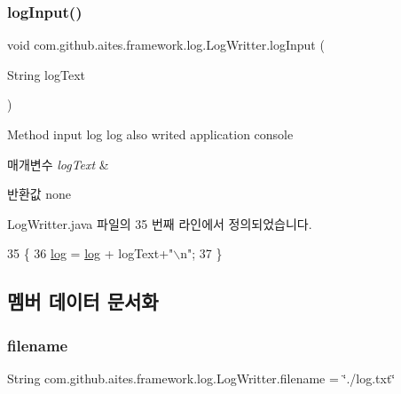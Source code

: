 \subsubsection{\texorpdfstring{log\+Input()}{logInput()}}
{\footnotesize\ttfamily void com.\+github.\+aites.\+framework.\+log.\+Log\+Writter.\+log\+Input (\begin{DoxyParamCaption}\item[{String}]{log\+Text }\end{DoxyParamCaption})}



Method input log log also writed application console 


\begin{DoxyParams}{매개변수}
{\em log\+Text} & \\
\hline
\end{DoxyParams}
\begin{DoxyReturn}{반환값}
none 
\end{DoxyReturn}


Log\+Writter.\+java 파일의 35 번째 라인에서 정의되었습니다.


\begin{DoxyCode}
35                                         \{
36         \mbox{\hyperlink{classcom_1_1github_1_1aites_1_1framework_1_1log_1_1_log_writter_a4166c55fe968efbdc9c0c00a14f76806}{log}} = \mbox{\hyperlink{classcom_1_1github_1_1aites_1_1framework_1_1log_1_1_log_writter_a4166c55fe968efbdc9c0c00a14f76806}{log}} + logText+\textcolor{stringliteral}{"\(\backslash\)n"};
37     \}
\end{DoxyCode}


\subsection{멤버 데이터 문서화}
\mbox{\label{classcom_1_1github_1_1aites_1_1framework_1_1log_1_1_log_writter_ad2861afbf5d3a065972fcb30ac4c84f4}} 
\subsubsection{\texorpdfstring{filename}{filename}}
{\footnotesize\ttfamily String com.\+github.\+aites.\+framework.\+log.\+Log\+Writter.\+filename = \char`\"{}./log.\+txt\char`\"{}\hspace{0.3cm}{\ttfamily [private]}}



